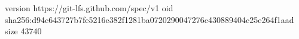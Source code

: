version https://git-lfs.github.com/spec/v1
oid sha256:d94c643727b7fe5216e382f1281ba0720290047276c430889404c25e264f1aad
size 43740
